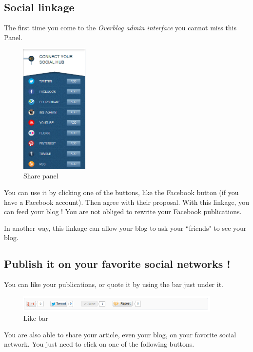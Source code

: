 \documentclass[a4paper,10pt]{article}
\begin{document}
\subsection{Social linkage}

The first time you come to the  \emph{Overblog admin interface} you cannot miss this Panel.
\begin{figure}[h]
    \center
  \includegraphics[width=0.3\textwidth]{Images/shareIni.png}
    \caption{Share panel}
\end{figure}

You can use it by clicking one of the buttons, like the Facebook button (if you have a Facebook account). Then agree with their proposal. With this linkage, you can feed your blog ! You are not obliged to rewrite your Facebook publications.

In another way, this linkage can allow your blog to ask your ``friends" to see your blog.

\subsection{Publish it on your favorite social networks !}

You can like your publications, or quote it by using the bar just under it.

\begin{figure}[h]
    \center
  \includegraphics[width=0.9\textwidth]{Images/articleBar.png}
    \caption{Like bar}
\end{figure}

You are also able to share your article, even your blog, on your favorite social network. You just need to click on one of the following buttons.
\end{document}

